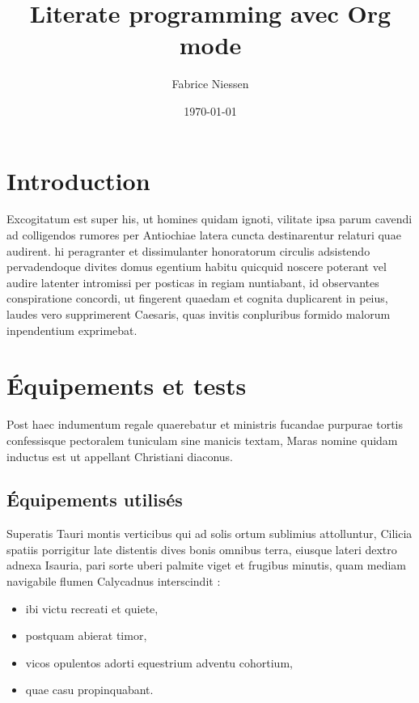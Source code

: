 \documentclass[11pt]{report}
\author{Fabrice Niessen}
\date{\today}
\title{Literate programming avec Org mode}
\begin{document}
\maketitle


\chapter{Introduction}
\label{sec:org8538a27}

Excogitatum est super his, ut homines quidam ignoti, vilitate ipsa parum cavendi
ad colligendos rumores per Antiochiae latera cuncta destinarentur relaturi quae
audirent. hi peragranter et dissimulanter honoratorum circulis adsistendo
pervadendoque divites domus egentium habitu quicquid noscere poterant vel audire
latenter intromissi per posticas in regiam nuntiabant, id observantes
conspiratione concordi, ut fingerent quaedam et cognita duplicarent in peius,
laudes vero supprimerent Caesaris, quas invitis conpluribus formido malorum
inpendentium exprimebat.

\chapter{Équipements et tests}
\label{sec:orgcf170d1}

Post haec indumentum regale quaerebatur et ministris fucandae purpurae tortis
confessisque pectoralem tuniculam sine manicis textam, Maras nomine quidam
inductus est ut appellant Christiani diaconus.

\section{Équipements utilisés}
\label{sec:orgdca4fb2}

Superatis Tauri montis verticibus qui ad solis ortum sublimius attolluntur,
Cilicia spatiis porrigitur late distentis dives bonis omnibus terra, eiusque
lateri dextro adnexa Isauria, pari sorte uberi palmite viget et frugibus
minutis, quam mediam navigabile flumen Calycadnus interscindit :

\begin{itemize}
\item ibi victu recreati et quiete,
\item postquam abierat timor,
\item vicos opulentos adorti equestrium adventu cohortium,
\item quae casu propinquabant.
\end{itemize}
\end{document}
